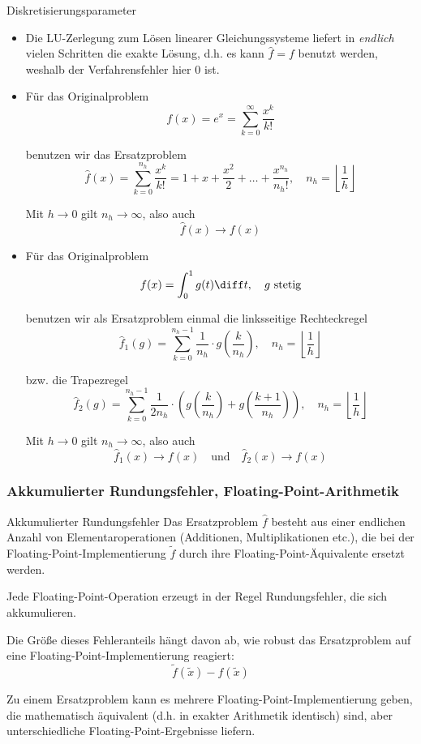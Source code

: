 \begin{example}{Diskretisierungsparameter}
    \begin{itemize}
    \item Die LU-Zerlegung zum Lösen linearer Gleichungssysteme liefert in \emph{endlich} vielen Schritten die exakte Lösung, d.h. es kann $\hat{f} = f$ benutzt werden, weshalb der Verfahrensfehler hier 0 ist.
    \item Für das Originalproblem
    \[
        f(x) = e^x = \sum_{k=0}^{\infty} \frac{x^k}{k!}    
    \]
    
    benutzen wir das Ersatzproblem 
    \[ 
        \hat{f}(x) = \sum_{k=0}^{n_h} \frac{x^k}{k!} = 1 + x + \frac{x^2}{2} + \ldots + \frac{x^{n_h}}{n_h!}, \quad n_h = \left\lfloor \frac{1}{h} \right\rfloor
    \]

    Mit $h \to 0$ gilt $n_h \to \infty$, also auch 
    \[
        \hat{f}(x) \to f(x)    
    \]
    \item Für das Originalproblem
    \[
        f(x) = \int_0^1 g(t) \diff t, \quad g \ \text{stetig}
    \]
    
    benutzen wir als Ersatzproblem einmal die linksseitige Rechteckregel
    \[ 
        \hat{f}_1(g) = \sum_{k=0}^{n_h - 1} \frac{1}{n_h} \cdot g \left( \frac{k}{n_h} \right), \quad n_h = \left\lfloor \frac{1}{h} \right\rfloor
    \]

    bzw. die Trapezregel
    \[
        \hat{f}_2(g) = \sum_{k=0}^{n_h - 1} \frac{1}{2n_h} \cdot \left( g \left( \frac{k}{n_h} \right) + g \left( \frac{k+1}{n_h} \right) \right), \quad n_h = \left\lfloor \frac{1}{h} \right\rfloor
    \]

    Mit $h \to 0$ gilt $n_h \to \infty$, also auch 
    \[
        \hat{f}_1(x) \to f(x) \quad \text{und} \quad \hat{f}_2(x) \to f(x)
    \]
    \end{itemize}
\end{example}

\subsubsection{Akkumulierter Rundungsfehler, Floating-Point-Arithmetik}

\begin{defi}{Akkumulierter Rundungsfehler}
    Das Ersatzproblem $\hat{f}$ besteht aus einer endlichen Anzahl von Elementaroperationen (Additionen, Multiplikationen etc.), die bei der Floating-Point-Implementierung $\tilde{f}$ durch ihre Floating-Point-Äquivalente ersetzt werden.

    Jede Floating-Point-Operation erzeugt in der Regel Rundungsfehler, die sich akkumulieren.

    Die Größe dieses Fehleranteils hängt davon ab, wie robust das Ersatzproblem auf eine Floating-Point-Implementierung reagiert:
    \[
        \tilde{f}(\tilde{x}) - \hat{f}(\tilde{x})
    \]

    Zu einem Ersatzproblem kann es mehrere Floating-Point-Implementierung geben, die mathematisch äquivalent (d.h. in exakter Arithmetik identisch) sind, aber unterschiedliche Floating-Point-Ergebnisse liefern.
\end{defi}


